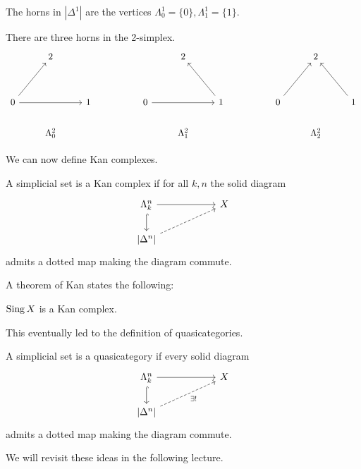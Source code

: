 \begin{example}[1-Horns]
  The horns in $|\Delta^{1}|$ are the vertices $\Lambda^{1}_{0}=\{0\}, \Lambda^{1}_{1}=\{1\}$. 
\end{example}
\begin{example}[2-Horns]
  There are three horns in the 2-simplex. 
  $$%
  \begin{tikzcd}
    & 2 &&&& 2 & {} &&& 2 \\
    \\
    0 && 1 && 0 && 1 && 0 && 1 \\
    & {\Lambda^{2}_{0}} &&&& {\Lambda^{2}_{1}} &&&& {\Lambda^{2}_{2}}
    \arrow[from=3-1, to=1-2]
    \arrow[from=3-1, to=3-3]
    \arrow[from=3-5, to=3-7]
    \arrow[from=3-7, to=1-6]
    \arrow[from=3-9, to=1-10]
    \arrow[from=3-11, to=1-10]
  \end{tikzcd}$$
\end{example}
We can now define Kan complexes. 
\begin{definition}
  A simplicial set is a Kan complex if for all $k,n$ the solid diagram
  $$%
  \begin{tikzcd}
    {\Lambda^{n}_{k}} & {} & X \\
    {|\Delta^{n}|}
    \arrow[from=1-1, to=1-3]
    \arrow[dashed, from=2-1, to=1-3]
    \arrow[hook, from=1-1, to=2-1]
  \end{tikzcd}$$
  admits a dotted map making the diagram commute. 
\end{definition}
A theorem of Kan states the following:
\begin{theorem}[Kan]
  $\operatorname{Sing} X$ is a Kan complex. 
\end{theorem}
This eventually led to the definition of quasicategories. 
\begin{definition}\label{def:quasicategory}
  A simplicial set is a quasicategory if every solid diagram
  $$%
  \begin{tikzcd}
    {\Lambda^{n}_{k}} & {} & X \\
    {|\Delta^{n}|}
    \arrow[from=1-1, to=1-3]
    \arrow["{\exists!}"', dashed, from=2-1, to=1-3]
    \arrow[hook, from=1-1, to=2-1]
  \end{tikzcd}$$
  admits a dotted map making the diagram commute. 
\end{definition}
We will revisit these ideas in the following lecture.  